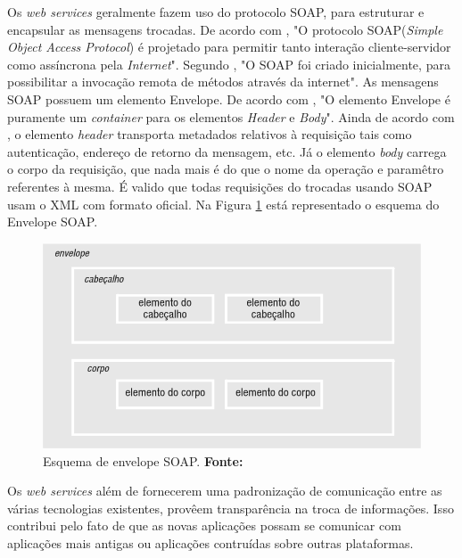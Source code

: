 	\par Os \textit{web services} geralmente fazem uso do protocolo SOAP, para
estruturar e encapsular as mensagens trocadas. De acordo com
, "O protocolo SOAP(\textit{Simple Object Access
Protocol}) é projetado para permitir tanto interação cliente-servidor como
assíncrona pela \textit{Internet}". Segundo , "O
SOAP foi criado inicialmente, para possibilitar a invocação remota de métodos
através da internet". As mensagens SOAP possuem um elemento Envelope. De acordo
com , "O elemento Envelope é puramente um
\textit{container} para os elementos \textit{Header} e \textit{Body}". Ainda de
acordo com , o elemento \textit{header} transporta
metadados relativos à requisição tais como autenticação, endereço de retorno da
mensagem, etc. Já o elemento \textit{body} carrega o corpo da requisição, que
nada mais é do que o nome da operação e paramêtro referentes à mesma. É valido
que todas requisições do trocadas usando SOAP usam o XML com formato oficial. Na
Figura \ref{fig:qt3} está representado o esquema do Envelope SOAP.

\begin{figure}[h!]
	\centerline{\includegraphics[scale=0.6]{./imagens/1_q_teorico/qt3.png}}
	\caption[Esquema de envelope SOAP. ]{Esquema de envelope SOAP. 
	 \textbf{Fonte:}}
	\label{fig:qt3}
\end{figure}

	\par Os \textit{web services} além de fornecerem uma padronização de
comunicação entre as várias tecnologias existentes, provêem transparência na
troca de informações. Isso contribui pelo fato de que as novas aplicações
possam se comunicar com aplicações mais antigas ou aplicações contruídas sobre
outras plataformas.

